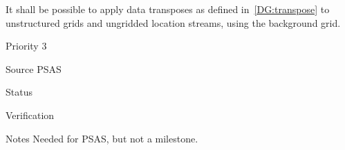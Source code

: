 
It shall be possible to apply data transposes as defined
in~\ref{DG:transpose} to unstructured grids and ungridded location
streams, using the background grid.

\begin{reqlist}
\item[Priority] 3
\item[Source] PSAS
\item[Status]
\item[Verification]
\item[Notes] Needed for PSAS, but not a milestone.
\end{reqlist}






